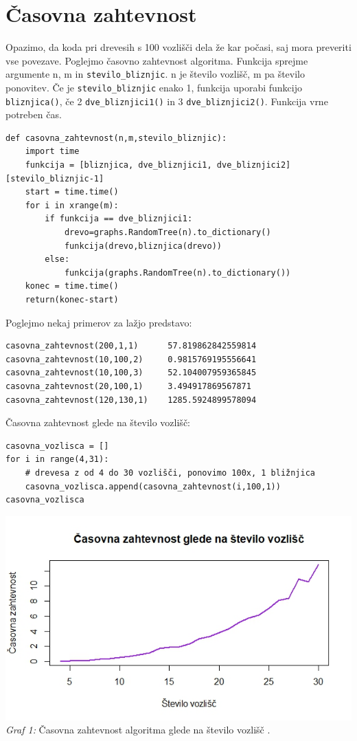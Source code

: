 \documentclass[a4paper,10pt]{article}
\begin{document}
\section{Časovna zahtevnost}
Opazimo, da koda pri drevesih s 100 vozlišči dela že kar počasi, saj mora preveriti vse povezave. Poglejmo časovno zahtevnost algoritma. Funkcija sprejme argumente n, m in \texttt{stevilo\_bliznjic}. n je število vozlišč, m pa število ponovitev. Če je \texttt{stevilo\_bliznjic} enako 1, funkcija uporabi funkcijo \texttt{bliznjica()}, če 2 \texttt{dve\_bliznjici1()} in 3 \texttt{dve\_bliznjici2()}. Funkcija vrne potreben čas.
\begin{verbatim}
def casovna_zahtevnost(n,m,stevilo_bliznjic):
    import time
    funkcija = [bliznjica, dve_bliznjici1, dve_bliznjici2][stevilo_bliznjic-1]
    start = time.time()
    for i in xrange(m):
        if funkcija == dve_bliznjici1:
            drevo=graphs.RandomTree(n).to_dictionary()
            funkcija(drevo,bliznjica(drevo))
        else:
            funkcija(graphs.RandomTree(n).to_dictionary())
    konec = time.time()
    return(konec-start)
\end{verbatim}
Poglejmo nekaj primerov za lažjo predstavo:
\begin{verbatim}
casovna_zahtevnost(200,1,1)      57.819862842559814
casovna_zahtevnost(10,100,2)     0.9815769195556641
casovna_zahtevnost(10,100,3)     52.104007959365845
casovna_zahtevnost(20,100,1)     3.494917869567871
casovna_zahtevnost(120,130,1)    1285.5924899578094
\end{verbatim}
Časovna zahtevnost glede na število vozlišč:
\begin{verbatim}
casovna_vozlisca = []
for i in range(4,31):
    # drevesa z od 4 do 30 vozlišči, ponovimo 100x, 1 bližnjica
    casovna_vozlisca.append(casovna_zahtevnost(i,100,1)) 
casovna_vozlisca
\end{verbatim}
\begin{center}
\includegraphics[scale = 0.8]{casovna}\\ 
\scriptsize{\textit{Graf 1: } Časovna zahtevnost algoritma glede na število vozlišč .}
\end{center}
\end{document}
